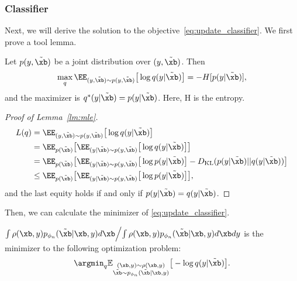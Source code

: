 \subsubsection{Classifier}
Next, we will derive the solution to the objective~\eqref{eq:update_classifier}. We first prove a tool lemma.
\begin{lemma}\label{lm:mle}
    Let $p(y,\tilde{\xb})$ be a joint distribution over $(y,\tilde{\xb})$. Then
    \begin{align*}
        \max_q \EE_{(y,\tilde{\xb}) \sim p(y,\tilde{\xb})} \big[ \log q(y | \tilde{\xb}) \big] = - H[p(y | \tilde{\xb})],
    \end{align*}
    and the maximizer is $q^*(y | \tilde{\xb}) = p(y | \tilde{\xb}) $. Here, H is the entropy.
\end{lemma}
\begin{proof}[Proof of Lemma~\ref{lm:mle}]
\begin{align*}
    \begin{aligned}
        L(q) & = \EE_{(y,\tilde{\xb}) \sim p(y,\tilde{\xb})} \big[ \log q(y | \tilde{\xb}) \big] \\
        & = \EE_{p(\tilde{\xb})}  \big[ \EE_{(y|\tilde{\xb}) \sim p(y,\tilde{\xb})} \big[ \log q(y | \tilde{\xb}) \big]\big] \\
        & = \EE_{p(\tilde{\xb})}  \big[ \EE_{(y|\tilde{\xb}) \sim p(y,\tilde{\xb})} \big[ \log p(y | \tilde{\xb}) \big] - D_{\text{KL}} (p(y | \tilde{\xb}) || q(y | \tilde{\xb}))\big] \\
        & \le \EE_{p(\tilde{\xb})}  \big[ \EE_{(y|\tilde{\xb}) \sim p(y,\tilde{\xb})} \big[ \log p(y | \tilde{\xb}) \big] \big],
    \end{aligned}
\end{align*}
    and the last equity holds if and only if $p(y | \tilde{\xb}) =  q(y | \tilde{\xb})$.
\end{proof}
Then, we can calculate the minimizer of \eqref{eq:update_classifier}.
\begin{lemma}\label{lm:nll_minimizer}
    ${\int \rho(\xb, y)  p_{\phi_n}(\tilde{\xb} | \xb, y) d\xb} \Big{/}{\int \rho(\xb,y)  p_{\phi_n}(\tilde{\xb} | \xb, y) d\xb dy}$ is the minimizer to the following optimization problem:
    \begin{align*}
        \argmin_q  \mathbb{E}_{\substack{(\xb,y) \sim \rho(\xb,y) \\ \tilde{\xb} \sim p_{\phi_n}(\tilde{\xb}|\xb, y)}} \big[- \log q (y|\tilde{\xb}) \big].
    \end{align*}
\end{lemma}
